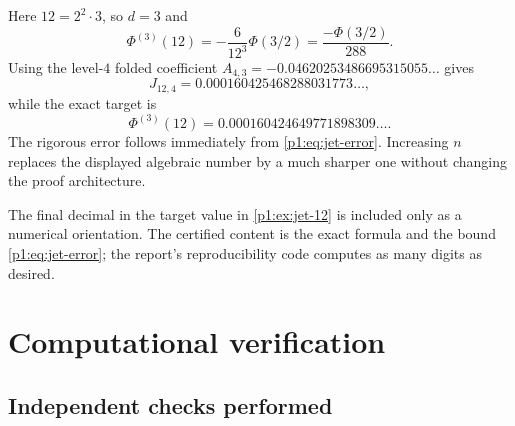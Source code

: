 \documentclass[11pt,oneside]{article}
\theoremstyle{definition}
\theoremstyle{remark}
\newcommand{\PhiU}{\Phi}
\begin{document}
\begin{example}[The zero at $m=12$]\label{p1:ex:jet-12}
Here $12=2^2\cdot3$, so $d=3$ and
\[
 \PhiU^{(3)}(12)=-\frac{6}{12^3}\PhiU(3/2)
 =\frac{-\PhiU(3/2)}{288}.
\]
Using the level-$4$ folded coefficient
$A_{4,3}=-0.04620253486695315055\ldots$ gives
\[
 J_{12,4}=0.000160425468288031773\ldots,
\]
while the exact target is
\[
 \PhiU^{(3)}(12)=0.000160424649771898309\ldots.
\]
The rigorous error follows immediately from \eqref{p1:eq:jet-error}.  Increasing
$n$ replaces the displayed algebraic number by a much sharper one without
changing the proof architecture.
\end{example}

\begin{warning}
The final decimal in the target value in \cref{p1:ex:jet-12} is included only as a
numerical orientation.  The certified content is the exact formula and the
bound \eqref{p1:eq:jet-error}; the report's reproducibility code computes as many
digits as desired.
\end{warning}

\section{Computational verification}\label{p1:sec:verification}

\subsection{Independent checks performed}
\end{document}
